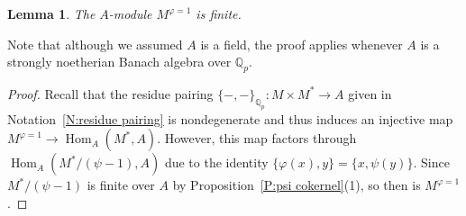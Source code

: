 \documentclass[12pt]{article}
\newtheorem{lemma}[theorem]{Lemma}
\theoremstyle{definition}
\numberwithin{equation}{theorem}
\newcommand{\QQ}{\mathbb{Q}}
\def\Qp{\QQ_p}
\DeclareMathOperator{\Hom}{Hom}
\begin{document}
\begin{lemma}\label{L:A=field structure of M^phi=1}
The $A$-module $M^{\varphi=1}$ is finite.
\end{lemma}
Note that although we assumed $A$ is a field, the proof applies whenever $A$ is a strongly noetherian Banach algebra over $\Qp$.
\begin{proof}
Recall that the residue pairing $\{-,-\}_{\Qp}: M \times M^* \to A$
given in Notation~\ref{N:residue pairing} is nondegenerate
and thus induces an injective map $M^{\varphi=1} \to \Hom_A(M^*, A)$.
However, this map factors through $\Hom_A(M^*/(\psi-1),A)$ due to the
identity $\{\varphi(x), y\} = \{x, \psi(y)\}$.
Since $M^*/(\psi-1)$ is finite over $A$ by Proposition~\ref{P:psi cokernel}(1), so then is $M^{\varphi=1}$.
\end{proof}
\end{document}
